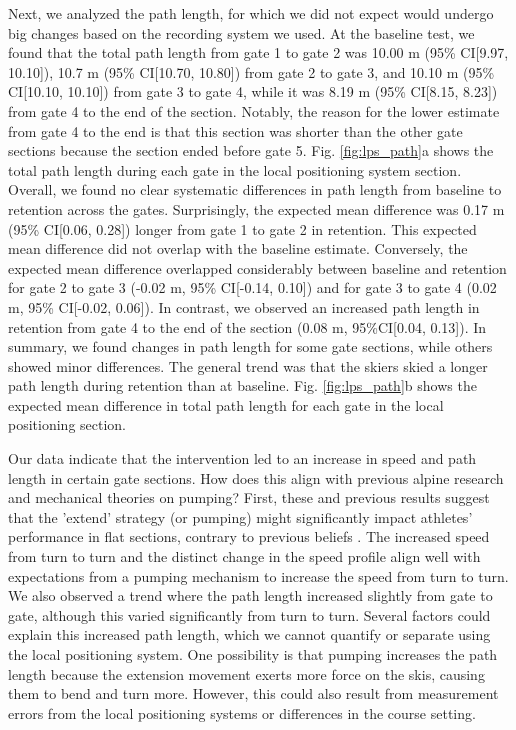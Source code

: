 Next, we analyzed the path length, for which we did not expect would undergo big changes based on the recording system we used. At the baseline test, we found that the total path length from gate 1 to gate 2 was 10.00 m (95\% CI[9.97, 10.10]), 10.7 m (95\% CI[10.70, 10.80]) from gate 2 to gate 3, and 10.10 m (95\% CI[10.10, 10.10]) from gate 3 to gate 4, while it was 8.19 m (95\% CI[8.15, 8.23]) from gate 4 to the end of the section. Notably, the reason for the lower estimate from gate 4 to the end is that this section was shorter than the other gate sections because the section ended before gate 5. Fig. \ref{fig:lps_path}a shows the total path length during each gate in the local positioning system section. Overall, we found no clear systematic differences in path length from baseline to retention across the gates. Surprisingly, the expected mean difference was 0.17 m (95\% CI[0.06, 0.28]) longer from gate 1 to gate 2 in retention. This expected mean difference did not overlap with the baseline estimate. Conversely, the expected mean difference overlapped considerably between baseline and retention for gate 2 to gate 3 (-0.02 m, 95\% CI[-0.14, 0.10]) and for gate 3 to gate 4 (0.02 m, 95\% CI[-0.02, 0.06]). In contrast, we observed an increased path length in retention from gate 4 to the end of the section (0.08 m, 95\%CI[0.04, 0.13]). In summary, we found changes in path length for some gate sections, while others showed minor differences. The general trend was that the skiers skied a longer path length during retention than at baseline. Fig. \ref{fig:lps_path}b shows the expected mean difference in total path length for each gate in the local positioning section. 

Our data indicate that the intervention led to an increase in speed and path length in certain gate sections. How does this align with previous alpine research and mechanical theories on pumping? First, these and previous results suggest that the 'extend' strategy (or pumping) might significantly impact athletes' performance in flat sections, contrary to previous beliefs \cite{supej_differential_2008, supej_doba_2001}. The increased speed from turn to turn and the distinct change in the speed profile align well with expectations from a pumping mechanism to increase the speed from turn to turn. We also observed a trend where the path length increased slightly from gate to gate, although this varied significantly from turn to turn. Several factors could explain this increased path length, which we cannot quantify or separate using the local positioning system. One possibility is that pumping increases the path length because the extension movement exerts more force on the skis, causing them to bend and turn more. However, this could also result from measurement errors from the local positioning systems or differences in the course setting.


